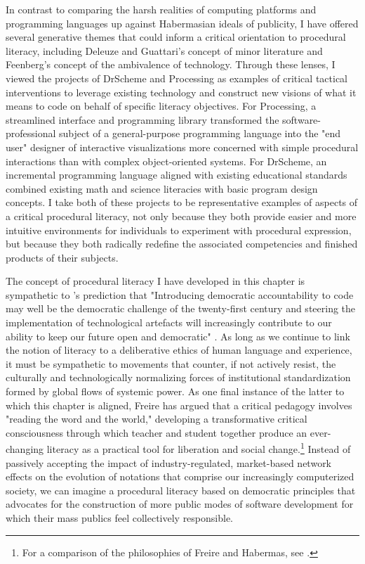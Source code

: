 In contrast to comparing the harsh realities of computing platforms and programming  languages up against Habermasian ideals of publicity, I have offered several generative themes that could inform a critical orientation to procedural literacy, including Deleuze and Guattari's concept of minor literature and Feenberg's concept of the ambivalence of technology. Through these lenses, I viewed the projects of DrScheme and Processing as examples of critical tactical interventions to leverage existing technology and construct new visions of what it means to code on behalf of specific literacy objectives. For Processing, a streamlined interface and programming library transformed the software-professional subject of a general-purpose programming language into the "end user" designer of interactive visualizations more concerned with simple procedural interactions than with complex object-oriented systems. For DrScheme, an incremental programming language aligned with existing educational standards combined existing math and science literacies with basic program design concepts. I take both of these projects to be representative examples of aspects of a critical procedural literacy, not only because they both provide easier and more intuitive environments for individuals to experiment with procedural expression, but because they both radically redefine the associated competencies and finished products of their subjects.

The concept of procedural literacy I have developed in this chapter is sympathetic to \citeauthor{Berry2008}'s prediction that "Introducing democratic accountability to code may well be the democratic challenge of the twenty-first century and steering the implementation of technological artefacts will increasingly contribute to our ability to keep our future open and democratic" \autocite[186]{Berry2008}. As long as we continue to link the notion of literacy to a deliberative ethics of human language and experience, it must be sympathetic to movements that counter, if not actively resist, the culturally and technologically normalizing forces of institutional standardization formed by global flows of systemic power. As one final instance of the latter to which this chapter is aligned, Freire has argued that a critical pedagogy involves "reading the word and the world," developing a transformative critical consciousness through which teacher and student together produce an ever-changing literacy as a practical tool for liberation and social change.\footnote{
  For a comparison of the philosophies of Freire and Habermas, see \autocite{Morrow02}.
} Instead of passively accepting the impact of industry-regulated, market-based network effects on the evolution of notations that comprise our increasingly computerized society, we can imagine a procedural literacy based on democratic principles that advocates for the construction of more public modes of software development for which their mass publics feel collectively responsible.
